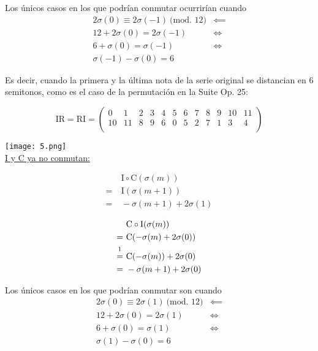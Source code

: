		Los únicos casos en los que podrían conmutar ocurrirían cuando
		\begin{align*}
		2\sigma\left(0\right)\equiv2\sigma(-1)\ \text{(mod. 12)}&\impliedby\\
		12+2\sigma\left(0\right)=2\sigma\left(-1\right)&\Longleftrightarrow\\
		6+\sigma\left(0\right)=\sigma\left(-1\right)&\Longleftrightarrow\\
		\sigma\left(-1\right)-\sigma\left(0\right)=6&
		\end{align*}
		
		Es decir, cuando la primera y la última nota de la serie original se distancian en 6 semitonos, como es el caso de la permutación en la Suite Op. 25:
		
		\[
		\text{IR}=\text{RI}=\left(\begin{matrix}0&1&2&3&4&5&6&7&8&9&10&11\\10&11&8&9&6&0&5&2&7&1&3&4\\\end{matrix}\right)
		\]	
		
		\texttt{[image: 5.png]}\\
		
		\newpage
		 \underline{I y C ya no conmutan:}
		\vspace{-2\bigskipamount}
		\begin{multicols}{2}
			\begin{align*}
			&\ \text{I}\circ\text{C}(\sigma(m))\\
			=&\ \text{I}(\sigma(m+1))\\
			=&\ -\sigma(m+1)+2\sigma(1)
			\end{align*}
			
			\begin{align*}
			&\ \text{C}\circ\text{I}(\sigma(m))\\
			=&\ \text{C}(-\sigma(m)+2\sigma(0))\\
			\overset{\footnotemark}{=}&\ \text{C}(-\sigma(m))+2\sigma(0)\\
			=&\ -\sigma(m+1)+2\sigma(0)
			\end{align*}
		\end{multicols}
		
		Los únicos casos en los que podrían conmutar son cuando
		\begin{align*}
		2\sigma\left(0\right)\equiv2\sigma(1)\ \text{(mod. 12)}&\impliedby\\
		12+2\sigma\left(0\right)=2\sigma\left(1\right)&\Longleftrightarrow\\
		6+\sigma\left(0\right)=\sigma\left(1\right)&\Longleftrightarrow\\
		\sigma\left(1\right)-\sigma\left(0\right)=6&
		\end{align*}
		
